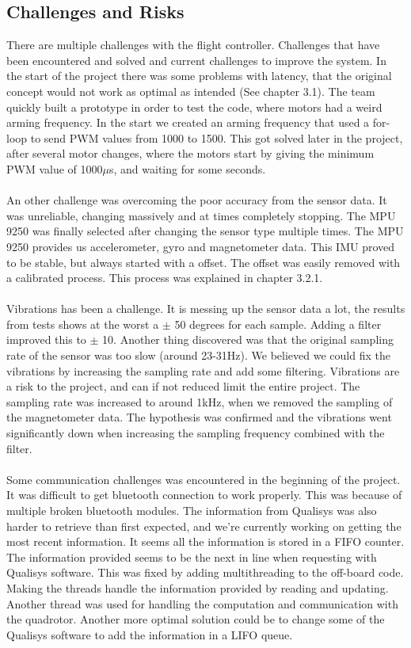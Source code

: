 \subsection{Challenges and Risks}
There are multiple challenges with the flight controller. Challenges that have been encountered and solved and current challenges to improve the system.
In the start of the project there was some problems with latency, that the original concept would not work as optimal as intended (See chapter 3.1). The team quickly built a prototype in order to test the code, where motors had a weird arming frequency. In the start we created an arming frequency that used a for-loop to send PWM values from 1000 to 1500. This got solved later in the project, after several motor changes, where the motors start by giving the minimum PWM value of 1000$\mu$s, and waiting for some seconds. 
\\\\
An other challenge was overcoming the poor accuracy from the sensor data. It was unreliable, changing massively and at times completely stopping. The MPU 9250 was finally selected after changing the sensor type multiple times. The MPU 9250 provides us accelerometer, gyro and magnetometer data. This IMU proved to be stable, but always started with a offset. The offset was easily removed with a calibrated process. This process was explained in chapter 3.2.1.
\\\\
Vibrations has been a challenge. It is messing up the sensor data a lot, the results from tests shows at the worst a $\pm$ 50 degrees for each sample. Adding a filter improved this to $\pm$ 10. Another thing discovered was that the original sampling rate of the sensor was too slow (around 23-31Hz). We believed we could fix the vibrations by increasing the sampling rate and add some filtering. Vibrations are a risk to the project, and can if not reduced limit the entire project. The sampling rate was increased to around 1kHz, when we removed the sampling of the magnetometer data. The hypothesis was confirmed and the vibrations went significantly down when increasing the sampling frequency combined with the filter. 
\\\\
Some communication challenges was encountered in the beginning of the project. It was difficult to get bluetooth connection to work properly. This was because of multiple broken bluetooth modules. The information from Qualisys was also harder to retrieve than first expected, and we're currently working on getting the most recent information. It seems all the information is stored in a FIFO counter. The information provided seems to be the next in line when requesting with Qualisys software. This was fixed by adding multithreading to the off-board code. Making the threads handle the information provided by reading and updating. Another thread was used for handling the computation and communication with the quadrotor. Another more optimal solution could be to change some of the Qualisys software to add the information in a LIFO queue.



